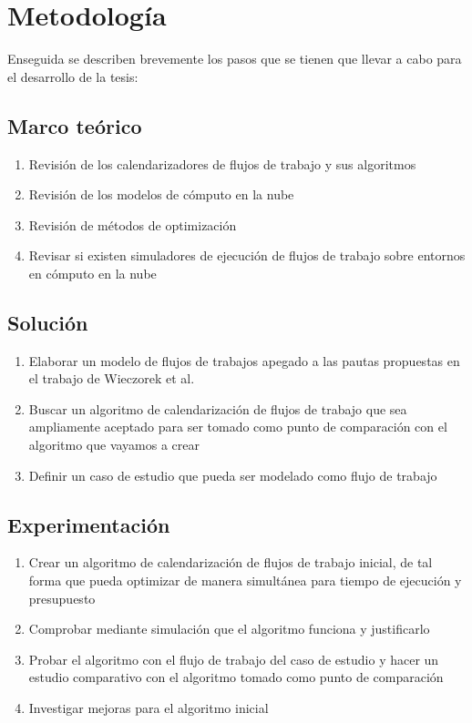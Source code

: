 \documentclass[letterpaper, 12pt]{report}
\begin{document}
\section*{Metodología}
Enseguida se describen brevemente los pasos que se tienen que llevar a cabo para el desarrollo de la tesis:
\subsection*{Marco teórico}
\begin{enumerate}
\item Revisión de los calendarizadores de flujos de trabajo y sus algoritmos
\item Revisión de los modelos de cómputo en la nube
\item Revisión de métodos de optimización
\item Revisar si existen simuladores de ejecución de flujos de trabajo sobre entornos en cómputo en la nube
\end{enumerate}

\subsection*{Solución}
\begin{enumerate}[resume]
\item Elaborar un modelo de flujos de trabajos apegado a las pautas propuestas en el trabajo de Wieczorek et al. \cite{wieczorek2009towards}
\item Buscar un algoritmo de calendarización de flujos de trabajo que sea ampliamente aceptado para ser tomado como punto de comparación con el algoritmo que vayamos a crear
\item Definir un caso de estudio que pueda ser modelado como flujo de trabajo
\end{enumerate}

\subsection*{Experimentación}
\begin{enumerate}[resume]
\item Crear un algoritmo de calendarización de flujos de trabajo inicial, de tal forma que pueda optimizar de manera simultánea para tiempo de ejecución y presupuesto
\item Comprobar mediante simulación que el algoritmo funciona y justificarlo
\item Probar el algoritmo con el flujo de trabajo del caso de estudio y hacer un estudio comparativo con el algoritmo tomado como punto de comparación
\item Investigar mejoras para el algoritmo inicial
\end{enumerate}
\end{document}
